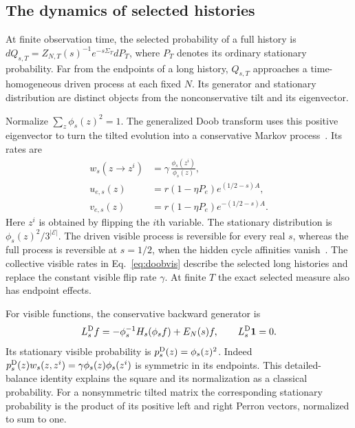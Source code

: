 \documentclass[aps,pre,reprint,amsmath,amssymb,longbibliography,floatfix]{revtex4-2}
\begin{document}
\subsection{The dynamics of selected histories}

At finite observation time, the selected probability of a full history is
$dQ_{s,T}=Z_{N,T}(s)^{-1}e^{-s\Sigma_T}dP_T$, where $P_T$ denotes its
ordinary stationary probability. Far from the endpoints of a long history,
$Q_{s,T}$ approaches a time-homogeneous driven process at each fixed $N$.
Its generator and stationary distribution are distinct objects from the
nonconservative tilt and its eigenvector.

Normalize $\sum_z\phi_s(z)^2=1$. The generalized Doob transform uses this
positive eigenvector to turn the tilted evolution into a conservative
Markov process~\cite{ChetriteTouchetteControl2015}. Its rates are
\begin{align}
 w_s(z\to z^i)&=\gamma\,\frac{\phi_s(z^i)}{\phi_s(z)},\label{eq:doobvis}\\
 u_{e,s}(z)&=r(1-\eta P_e)e^{(1/2-s)A},\nonumber\\
 v_{e,s}(z)&=r(1-\eta P_e)e^{-(1/2-s)A}.
 \label{eq:doobhidden}
\end{align}
Here $z^i$ is obtained by flipping the $i$th variable. The stationary
distribution is $\phi_s(z)^2/3^{|\mathcal E|}$.
The driven visible process is reversible for every real $s$, whereas the
full process is reversible at $s=1/2$, when the hidden cycle affinities
vanish~\cite{PriorityBonancaJarzynski2016}. The collective visible rates in Eq.~\eqref{eq:doobvis} describe
the selected long histories and replace the constant visible flip rate
$\gamma$. At finite $T$ the exact selected measure also has endpoint effects.

For visible functions, the conservative backward generator is
\begin{equation}
 L_s^{\rm D}f=-\phi_s^{-1}H_s(\phi_s f)+E_N(s)f,
 \qquad L_s^{\rm D}\mathbf1=0.
 \label{eq:doob-generator-convention}
\end{equation}
Its stationary visible probability is $p_s^{\rm D}(z)=\phi_s(z)^2$.
Indeed $p_s^{\rm D}(z)w_s(z,z^i)=\gamma\phi_s(z)\phi_s(z^i)$ is
symmetric in its endpoints. This detailed-balance identity explains the
square and its normalization as a classical probability. For a nonsymmetric tilted matrix the
corresponding stationary probability is the product of its positive
left and right Perron vectors, normalized to sum to one.
\end{document}
